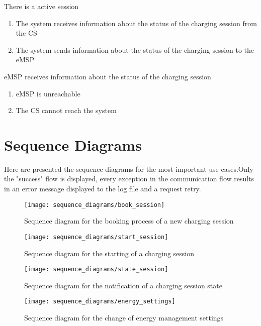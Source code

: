 \begin{enumerate}
	{There is a active session }
	{
	\begin{enumerate}[1.]
	\item The system receives information about the status of the charging session from the CS
	\item The system sends information about the status of the charging session to the eMSP
	\end{enumerate}
	}
	{eMSP receives information about the status of the charging session}
	{
	\begin{enumerate}[1.]
	\item eMSP is unreachable
	\item The CS cannot reach the system
	\end{enumerate}
	}
	
	
\end{enumerate}
\clearpage
\newpage

\section{Sequence Diagrams}
Here are presented the sequence diagrams for the most important use cases.Only the "success" flow is displayed, every exception in the communication flow results in an error message displayed to the log file and a request retry.\\

\begin{figure}[h]
\centering
\texttt{[image: sequence\_diagrams/book\_session]}
\caption{Sequence diagram for the booking process of a new charging session}
\end{figure}


\begin{figure}[h]
\centering
\texttt{[image: sequence\_diagrams/start\_session]}
\caption{Sequence diagram for the starting of a charging session}
\end{figure}


\begin{figure}[h]
\centering
\texttt{[image: sequence\_diagrams/state\_session]}
\caption{Sequence diagram for the notification of a charging session state }
\end{figure}


\begin{figure}[h]
\centering
\texttt{[image: sequence\_diagrams/energy\_settings]}
\caption{Sequence diagram for the change of energy management settings}
\end{figure}

